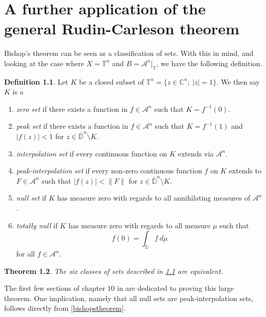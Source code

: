 \documentclass[a4paper,12pt,twoside,BCOR=10mm]{scrbook}
\newtheorem{theorem}{Theorem}[section]
\theoremstyle{definition}
\theoremstyle{definition}
\theoremstyle{definition}
\newtheorem{definition}[theorem]{Definition}
\begin{document}
\chapter{A further application of the general Rudin-Carleson theorem}
\label{section4}
Bishop's theorem can be seen as a classification of sets.
With this in mind, and looking at the case where $X = \mathbb{T}^n$ and $B = \mathcal{A}^n|_{\mathbb{T}}$, we have the following definition.
\begin{definition}
\label{bigdef}
Let $K$ be a closed subset of $\mathbb{T}^n = \{z \in \mathbb{C}^n;\ |z| = 1\}$.
We then say $K$ is a
\begin{enumerate}
	\item \emph{zero set} if there exists a function in $f \in \mathcal{A}^n$ such that $K = f^{-1}(0)$.
	\item \emph{peak set} if there exists a function in $f \in \mathcal{A}^n$ such that $K = f^{-1}(1)$ and $|f(z)| < 1$ for $z \in \overline{\mathbb{D}}^n \setminus K$.
	\item \emph{interpolation set} if every continuous function on $K$ extends via $\mathcal{A}^n$. 
	\item \emph{peak-interpolation set} if every non-zero continuous function $f$ on $K$ extends to $F \in \mathcal{A}^n$ such that $|f(z)| < \|F\|$ for $z \in \overline{\mathbb{D}}^n \setminus K$.
	\item \emph{null set} if $K$ has measure zero with regards to all annihilating measures of $\mathcal{A}^n$.
	\item \emph{totally null} if $K$ has measure zero with regards to all measure $\mu$ such that
			\[
				f(0) = \int_{\mathbb{D}} f\ d\mu
			\]
			for all $f \in \mathcal{A}^n$.
\end{enumerate}
\end{definition}
\begin{theorem}
	The six classes of sets described in \ref{bigdef} are equivalent.
\end{theorem}
The first few sections of chapter $10$ in \citep{rudin3} are dedicated to proving this large theorem.
One implication, namely that all null sets are peak-interpolation sets, follows directly from \ref{bishopstheorem}.


\end{document}
